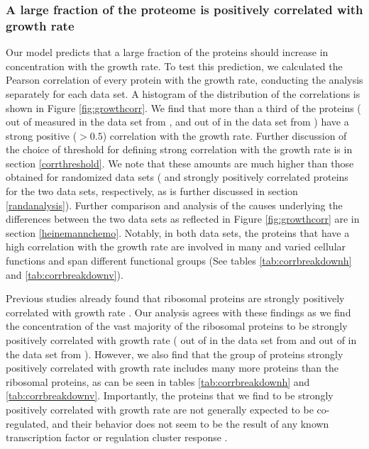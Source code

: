 \subsubsection{A large fraction of the proteome is positively correlated with growth rate}
Our model predicts that a large fraction of the proteins should increase in concentration with the growth rate.
To test this prediction, we calculated the Pearson correlation of every protein with the growth rate, conducting the analysis separately for each data set.
A histogram of the distribution of the correlations is shown in Figure \ref{fig:growthcorr}.
We find that more than a third of the proteins (\hGlobal{} out of \hTotal{} measured in the data set from \cite{Heinemann2015}, and \vGlobal{} out of \vTotal{} in the data set from \cite{Peebo_2015}) have a strong positive ($>0.5$) correlation with the growth rate.
Further discussion of the choice of threshold for defining strong correlation with the growth rate is in section \ref{corrthreshold}.
We note that these amounts are much higher than those obtained for randomized data sets (\hGlobalShuff{} and \vGlobalShuff{} strongly positively correlated proteins for the two data sets, respectively, as is further discussed in section \ref{randanalysis}).
Further comparison and analysis of the causes underlying the differences between the two data sets as reflected in Figure \ref{fig:growthcorr} are in section \ref{heinemannchemo}.
Notably, in both data sets, the proteins that have a high correlation with the growth rate are involved in many and varied cellular functions and span different functional groups (See tables \ref{tab:corrbreakdownh} and \ref{tab:corrbreakdownv}).

Previous studies already found that ribosomal proteins are strongly positively correlated with growth rate \cite{Pedersen1978a, ingraham1983growth, Klumpp2008}.
Our analysis agrees with these findings as we find the concentration of the vast majority of the ribosomal proteins to be strongly positively correlated with growth rate (\hCorrRibs{} out of \hRibs{} in the data set from \cite{Heinemann2015} and \vCorrRibs{} out of \vRibs{} in the data set from \cite{Peebo_2015}).
However, we also find that the group of proteins strongly positively correlated with growth rate includes many more proteins than the ribosomal proteins, as can be seen in tables \ref{tab:corrbreakdownh} and \ref{tab:corrbreakdownv}.
Importantly, the proteins that we find to be strongly positively correlated with growth rate are not generally expected to be co-regulated, and their behavior does not seem to be the result of any known transcription factor or regulation cluster response \cite{23203884}.